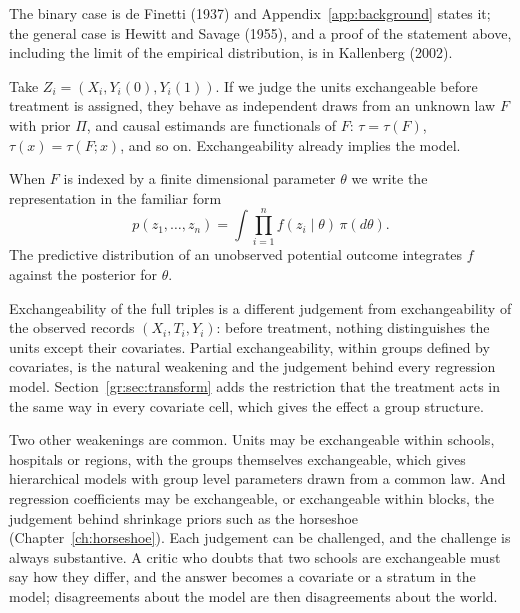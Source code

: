 The binary case is de Finetti (1937) and Appendix~\ref{app:background} states it; the general case is Hewitt and Savage (1955), and a proof of the statement above, including the limit of the empirical distribution, is in Kallenberg (2002).

Take $Z_i = (X_i, Y_i(0), Y_i(1))$. If we judge the units exchangeable before treatment is assigned, they behave as independent draws from an unknown law $F$ with prior $\Pi$, and causal estimands are functionals of $F$: $\tau = \tau(F)$, $\tau(x) = \tau(F; x)$, and so on. Exchangeability already implies the model.

When $F$ is indexed by a finite dimensional parameter $\theta$ we write the representation in the familiar form
\begin{equation}
p(z_1, \ldots, z_n) = \int \prod_{i=1}^n f(z_i \mid \theta) \, \pi(d\theta).
\label{eq:definetti}
\end{equation}
The predictive distribution of an unobserved potential outcome integrates $f$ against the posterior for $\theta$.

\begin{remark}
Exchangeability of the full triples is a different judgement from exchangeability of the observed records $(X_i, T_i, Y_i)$: before treatment, nothing distinguishes the units except their covariates. Partial exchangeability, within groups defined by covariates, is the natural weakening and the judgement behind every regression model. Section~\ref{gr:sec:transform} adds the restriction that the treatment acts in the same way in every covariate cell, which gives the effect a group structure.
\end{remark}

Two other weakenings are common. Units may be exchangeable within schools, hospitals or regions, with the groups themselves exchangeable, which gives hierarchical models with group level parameters drawn from a common law. And regression coefficients may be exchangeable, or exchangeable within blocks, the judgement behind shrinkage priors such as the horseshoe (Chapter~\ref{ch:horseshoe}). Each judgement can be challenged, and the challenge is always substantive. A critic who doubts that two schools are exchangeable must say how they differ, and the answer becomes a covariate or a stratum in the model; disagreements about the model are then disagreements about the world.

